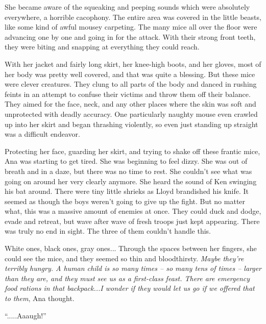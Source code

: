 \documentclass[
]{article}
\begin{document}
She became aware of the squeaking and peeping sounds which were
absolutely everywhere, a horrible cacophony. The entire area was covered
in the little beasts, like some kind of awful mousey carpeting. The many
mice all over the floor were advancing one by one and going in for the
attack. With their strong front teeth, they were biting and snapping at
everything they could reach.

With her jacket and fairly long skirt, her knee-high boots, and her
gloves, most of her body was pretty well covered, and that was quite a
blessing. But these mice were clever creatures. They clung to all parts
of the body and danced in rushing feints in an attempt to confuse their
victims and throw them off their balance. They aimed for the face, neck,
and any other places where the skin was soft and unprotected with deadly
accuracy. One particularly naughty mouse even crawled up into her skirt
and began thrashing violently, so even just standing up straight was a
difficult endeavor.

Protecting her face, guarding her skirt, and trying to shake off these
frantic mice, Ana was starting to get tired. She was beginning to feel
dizzy. She was out of breath and in a daze, but there was no time to
rest. She couldn't see what was going on around her very clearly
anymore. She heard the sound of Ken swinging his bat around. There were
tiny little shrieks as Lloyd brandished his knife. It seemed as though
the boys weren't going to give up the fight. But no matter what, this
was a massive amount of enemies at once. They could duck and dodge,
evade and retreat, but wave after wave of fresh troops just kept
appearing. There was truly no end in sight. The three of them couldn't
handle this.

White ones, black ones, gray ones... Through the spaces between her
fingers, she could see the mice, and they seemed so thin and
bloodthirsty. \emph{Maybe they're terribly hungry. A human child is so
many times -- so many tens of times -- larger than they are, and they
must see us as a first-class feast. There are emergency food rations in
that backpack...I wonder if they would let us go if we offered that to
them}, Ana thought.

``.....Aaaugh!''
\end{document}
